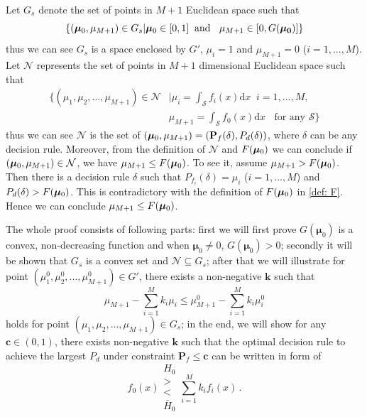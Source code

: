 Let $G_s$ denote the set of points in $M+1$ Euclidean space such that 
\[
 \{(\boldsymbol{\mu}_0, \mu_{M+1})\in G_s | \boldsymbol{\mu}_0\in [0, 1]\;\; \text{and }\;\;\mu_{M+1} \in [0, G(\mathbf{\boldsymbol{\mu}_0})]
    \}
\]
thus we can see $G_s$ is a space enclosed by $G'$, $\mu_i = 1$ and $\mu_{M+1}=0$ ($i=1, ..., M$).
Let $\mathcal{N}$ represents the set of points in $M+1$ dimensional Euclidean space such that  
\begin{equation}
\begin{split}
\{(\mu_1, \mu_2, ..., \mu_{M+1})\in \mathcal{N} &| \mu_i = \int_{\mathcal{S}}f_i(x)\mathrm{d}x \;\;i=1, ..., M,\\
                                            &  \mu_{M+1}=\int_{\mathcal{S}}f_{0}(x)\mathrm{d}x \;\;\text{ for any $\mathcal{S}$}\}
\end{split}
\end{equation}
thus we can see $\mathcal{N}$ is the set of $(\boldsymbol{\mu}_0, \mu_{M+1})=(\mathbf{P}_f(\delta), P_d(\delta))$, where $\delta$ can be any decision rule. Moreover, from the definition of $\mathcal{N}$ and $F(\boldsymbol{\mu}_0)$ we can conclude if $(\boldsymbol{\mu}_0, \mu_{M+1}) \in \mathcal{N}$, we have $\mu_{M+1} \leq F(\boldsymbol{\mu}_0)$. 
To see it, assume $\mu_{M+1} > F(\boldsymbol{\mu}_0)$. Then there is a decision rule $\delta$ such that $P_{f_i}(\delta) = \mu_i$ ($i=1, ..., M$) and $P_d(\delta) > F(\boldsymbol{\mu}_0)$. This is contradictory with the definition of $F(\boldsymbol{\mu}_0)$ in \eqref{def: F}. Hence we can conclude $\mu_{M+1} \leq F(\boldsymbol{\mu}_0)$.

The whole proof consists of following parts: first we will first prove $G(\boldsymbol{\mu}_0)$ is a convex, non-decreasing function and when $\boldsymbol{\mu}_0 \neq 0$, $G(\boldsymbol{\mu}_0) > 0$;
secondly it will be shown that $G_s$ is a convex set and $\mathcal{N} \subseteq G_s$; 
after that we will illustrate for point $(\mu_1^0, \mu_2^0, ..., \mu_{M+1}^0) \in G'$, there exists a non-negative $\mathbf{k}$ such that 
\[
\mu_{M+1} - \sum_{i=1}^{M}k_i\mu_i \leq \mu_{M+1}^0 - \sum_{i=1}^{M}k_i\mu_i^0
\]
holds for point $(\mu_1, \mu_2, ..., \mu_{M+1}) \in G_s$;
in the end, we will show for any $\mathbf{c} \in (0, 1)$, there exists non-negative $\mathbf{k}$ such that the optimal decision rule to achieve the largest $P_d$ under constraint $\mathbf{P}_f \leq \mathbf{c}$ can be written in form of 
\[
f_0(x) \substack{H_0 \\ > \\ < \\ \bar{H}_0} \sum_{i=1}^{M}k_if_i(x)\,.
\]

